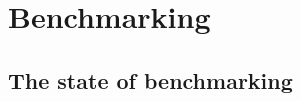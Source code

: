 
\section{Benchmarking}
\label{section:benchmarking}



\subsection{The state of benchmarking}






